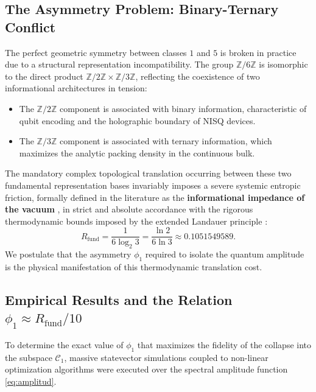 \documentclass[12pt,a4paper]{article}
\theoremstyle{plain}
\theoremstyle{definition}
\theoremstyle{remark}
\begin{document}
\subsection{The Asymmetry Problem: Binary-Ternary Conflict}

The perfect geometric symmetry between classes $1$ and $5$ is broken in practice due to a structural representation incompatibility. The group $\mathbb{Z}/6\mathbb{Z}$ is isomorphic to the direct product $\mathbb{Z}/2\mathbb{Z} \times \mathbb{Z}/3\mathbb{Z}$, reflecting the coexistence of two informational architectures in tension:
\begin{itemize}
    \item The $\mathbb{Z}/2\mathbb{Z}$ component is associated with binary information, characteristic of qubit encoding and the holographic boundary of NISQ devices.
    \item The $\mathbb{Z}/3\mathbb{Z}$ component is associated with ternary information, which maximizes the analytic packing density in the continuous bulk.
\end{itemize}
The mandatory complex topological translation occurring between these two fundamental representation bases invariably imposes a severe systemic entropic friction, formally defined in the literature as the \textbf{informational impedance of the vacuum} \cite{Peinador_Genesis_e_2025}, in strict and absolute accordance with the rigorous thermodynamic bounds imposed by the extended Landauer principle \cite{Landauer1961}:
\begin{equation}
R_{\text{fund}} = \frac{1}{6\log_2 3} = \frac{\ln 2}{6\ln 3} \approx 0.1051549589.
\label{eq:rfund}
\end{equation}
We postulate that the asymmetry $\phi_1$ required to isolate the quantum amplitude is the physical manifestation of this thermodynamic translation cost.

\subsection{Empirical Results and the Relation $\phi_1 \approx R_{\text{fund}}/10$}

To determine the exact value of $\phi_1$ that maximizes the fidelity of the collapse into the subspace $\mathcal{C}_1$, massive statevector simulations coupled to non-linear optimization algorithms were executed over the spectral amplitude function \eqref{eq:amplitud}. 
\end{document}
